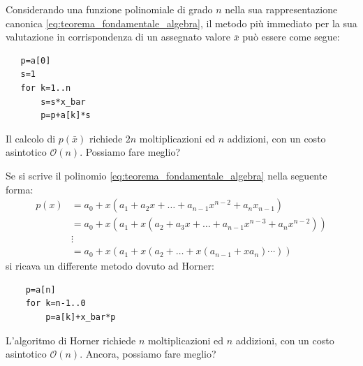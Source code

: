 \documentclass{article}
\begin{document}
Considerando una funzione polinomiale di grado $n$ nella sua rappresentazione
canonica \ref{eq:teorema_fondamentale_algebra}, il metodo più immediato per la sua valutazione in corrispondenza di un
assegnato valore $\bar{x}$ può essere come segue:
\begin{verbatim}
   p=a[0]
   s=1
   for k=1..n
       s=s*x_bar
       p=p+a[k]*s
\end{verbatim}
Il calcolo di $p(\bar{x})$ richiede $2n$ moltiplicazioni ed $n$ addizioni, con
un costo asintotico $\mathcal{O}(n)$. Possiamo fare meglio?

Se si scrive il polinomio \ref{eq:teorema_fondamentale_algebra} nella seguente
forma:
\begin{equation}
   \begin{aligned}
       p(x)&=a_0+x(a_1+a_2x+\ldots+a_{n-1}x^{n-2}+a_nx_{n-1}) \\
           &=a_0+x(a_1+x(a_2+a_3x+\ldots+a_{n-1}x^{n-3}+a_nx^{n-2}))\\ 
           &\vdots \\ 
           &=a_0+x(a_1+x(a_2+\ldots+x(a_{n-1}+xa_n)\cdots))
   \end{aligned} 
\end{equation}
si ricava un differente metodo dovuto ad Horner: 
\begin{verbatim}
    p=a[n]
    for k=n-1..0
        p=a[k]+x_bar*p
\end{verbatim}
L'algoritmo di Horner richiede $n$ moltiplicazioni ed $n$ addizioni, con un
costo asintotico $\mathcal{O}(n)$. Ancora, possiamo fare meglio?
\end{document}
